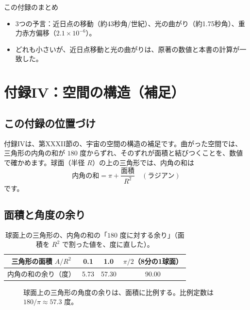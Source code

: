 \documentclass[a4paper,11pt,openany]{ltjsbook}
\begin{document}
\begin{pointbox}{この付録のまとめ}
\begin{itemize}[leftmargin=*]
\item 3つの予言：近日点の移動（約43秒角/世紀）、光の曲がり（約1.75秒角）、重力赤方偏移（$2.1\times10^{-6}$）。
\item どれも小さいが、近日点移動と光の曲がりは、原著の数値と本書の計算が一致した。
\end{itemize}
\end{pointbox}

\chapter{付録IV：空間の構造（補足）}

\section{この付録の位置づけ}

付録IVは、第XXXII節の、宇宙の空間の構造の補足です。曲がった空間では、三角形の内角の和が $180$ 度からずれ、そのずれが面積と結びつくことを、数値で確かめます。球面（半径 $R$）の上の三角形では、内角の和は
\[
\text{内角の和}=\pi+\frac{\text{面積}}{R^2}\quad(\text{ラジアン})
\]
です。

\section{面積と角度の余り}

\begin{table}[htbp]
\centering
\begin{tabular}{c|ccc}
\toprule
三角形の面積 $A/R^2$ & 0.1 & 1.0 & $\pi/2$（8分の1球面）\\
\midrule
内角の和の余り（度） & 5.73 & 57.30 & 90.00\\
\bottomrule
\end{tabular}
\caption{球面上の三角形の、内角の和の「$180$ 度に対する余り」（面積を $R^2$ で割った値を、度に直した）。}
\end{table}

\begin{figure}[htbp]
\centering
{}
\caption{球面上の三角形の角度の余りは、面積に比例する。比例定数は $180/\pi\approx57.3$ 度。}
\end{figure}
\end{document}
